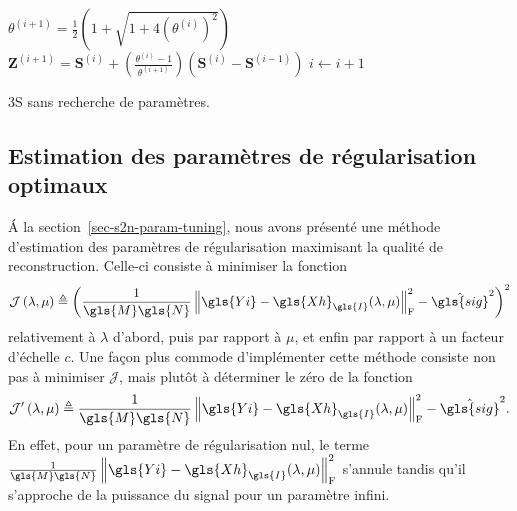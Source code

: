 \begin{normalalgorithme*}
\begin{minipage}{\textwidth}
\begin{algorithm}[H]
{                    
                    $\theta^{(i+1)} = \frac{1}{2} \left(1+\sqrt{1+4(\theta^{(i)})^2}\right)$\;
                    $\mathbf{Z}^{(i+1)} = \mathbf{S}^{(i)} + \left( \frac{\theta^{(i)}-1}{\theta^{(i+1)}} \right) \left(\mathbf{S}^{(i)}-\mathbf{S}^{(i-1)} \right)$\;
                    $i \leftarrow i+1$
                }
                \medskip
            \end{algorithm}
        \end{minipage}
        \caption{3S sans recherche de paramètres.\protect\label{algo-3S-sans-param}}
    \end{normalalgorithme*}


    \subsection{Estimation des paramètres de régularisation optimaux}

    \'A la section~\ref{sec-s2n-param-tuning}, nous avons présenté une méthode d'estimation des paramètres de régularisation maximisant la qualité de reconstruction. Celle-ci consiste à minimiser la fonction
\begin{equation}
\mathcal{J}\left(\lambda,\mu\right) \triangleq \left(\frac{1}{\gls{M}\gls{N}}\left\|\gls{Yi}-\gls{Xh}_{\gls{I}}{(\lambda,\mu)}\right\|_{\mathrm{F}}^2-\hat{\gls{sig}}^2\right)^2
\end{equation}
relativement à $\lambda$ d'abord, puis par rapport à $\mu$, et enfin par rapport à un facteur d'échelle $c$. Une façon plus commode d'implémenter cette méthode consiste non pas à minimiser $\mathcal{J}$, mais plutôt à déterminer le zéro de la fonction
\begin{equation}
\mathcal{J}'\left(\lambda,\mu\right) \triangleq \frac{1}{\gls{M}\gls{N}}\left\|\gls{Yi}-\gls{Xh}_{\gls{I}}{(\lambda,\mu)}\right\|_{\mathrm{F}}^2-\hat{\gls{sig}}^2.
\end{equation}
En effet, pour un paramètre de régularisation nul, le terme $\frac{1}{\gls{M}\gls{N}}\left\|\gls{Yi}-\gls{Xh}_{\gls{I}}{(\lambda,\mu)}\right\|_{\mathrm{F}}^2$ s'annule tandis qu'il s'approche de la puissance du signal pour un paramètre infini.

